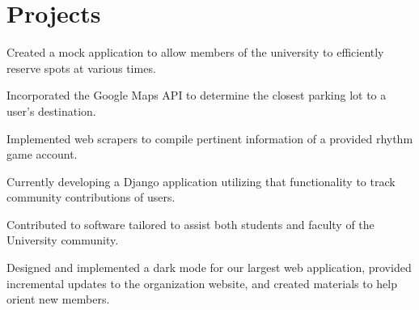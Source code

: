 \documentclass[]{deedy-resume-openfont}
\begin{document}
\section{Projects}
\begin{tightemize}
\item Created a mock application to allow members of the university to efficiently reserve spots at various times. 
\item Incorporated the Google Maps API to determine the closest parking lot to a user's destination.
\end{tightemize}
\sectionsep

\begin{tightemize}
\item Implemented web scrapers to compile pertinent information of a provided rhythm game account. 
\item Currently developing a Django application utilizing that functionality to track community contributions of users.
\end{tightemize}
\sectionsep

\begin{tightemize}
\item Contributed to software tailored to assist both students and faculty of the University community.
\item Designed and implemented a dark mode for our largest web application, provided incremental updates to the organization website, and created materials to help orient new members.
\end{tightemize}
\end{document}
